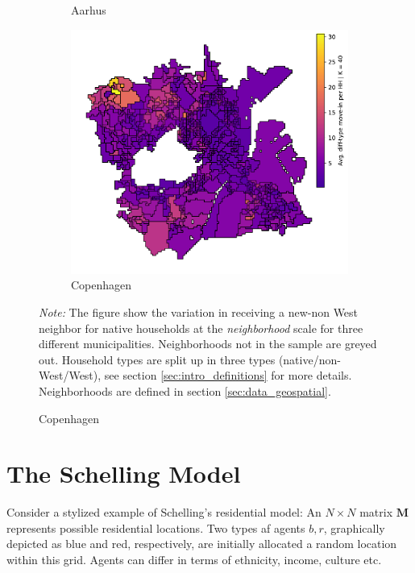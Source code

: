\documentclass[../main.tex]{subfiles}
\begin{document}
\begin{figure}
\begin{subfigure}{.42\textwidth}
	\caption{Aarhus}
	\end{subfigure}
    
    \begin{subfigure}{.65\textwidth}	
	\centering
	\includegraphics[width=\textwidth]{figs/cph_howdy_neighbor.pdf}	
	\caption{Copenhagen}
	\end{subfigure}	
\begin{tablenotes}
\item \footnotesize \textit{Note:} The figure show the variation in receiving a new-non West neighbor for native households at the \textit{neighborhood} scale for three different municipalities. Neighborhoods not in the sample are greyed out. Household types are split up in three types (native/non-West/West), see section \ref{sec:intro_definitions} for more details. Neighborhoods are defined in section \ref{sec:data_geospatial}. 
\end{tablenotes}
\label{fig:incidence_new_non_west_neighbors_unconstrained}
\end{figure}

\section{The Schelling Model}

\label{sec:appendix_schelling_model_simulation}

Consider a stylized example of Schelling's residential model: 
An $N \times N$ matrix $\textbf{M}$ represents possible residential locations. Two types af agents $b, r$, graphically depicted as blue and red, respectively, are initially allocated a random location within this grid. Agents can differ in terms of ethnicity, income, culture etc. 
\end{document}
